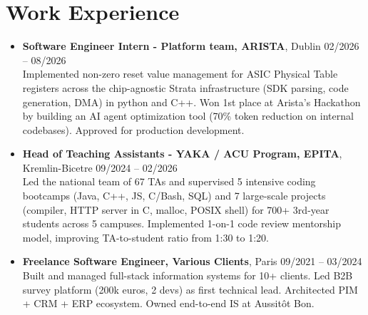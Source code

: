 \documentclass[9pt,a4paper]{article}
\begin{document}
\section*{Work Experience}
\begin{tcolorbox}[mybox]
\begin{itemize}
\item\textbf{Software Engineer Intern - Platform team, ARISTA}, Dublin \hfill {\small02/2026 – 08/2026}\\[0.5em]
\textcolor{gray!40!black}{Implemented non-zero reset value management for ASIC Physical Table registers across the chip-agnostic Strata infrastructure (SDK parsing, code generation, DMA) in python and C++.
Won 1st place at Arista's Hackathon by building an AI agent optimization tool (70\% token reduction on internal codebases). Approved for production development.}

\item\textbf{Head of Teaching Assistants - YAKA / ACU Program, EPITA}, Kremlin-Bicetre \hfill {\small09/2024 – 02/2026}\\[0.5em]
\textcolor{gray!40!black}{Led the national team of 67 TAs and supervised 5 intensive coding bootcamps (Java, C++, JS, C/Bash, SQL) and 7 large-scale projects (compiler, HTTP server in C, malloc, POSIX shell) for 700+ 3rd-year students across 5 campuses. Implemented 1-on-1 code review mentorship model, improving TA-to-student ratio from 1:30 to 1:20.}

\item\textbf{Freelance Software Engineer, Various Clients}, Paris \hfill {\small09/2021 – 03/2024}\\[0.5em]
\textcolor{gray!40!black}{Built and managed full-stack information systems for 10+ clients. Led B2B survey platform (200k euros, 2 devs) as first technical lead. Architected PIM + CRM + ERP ecosystem. Owned end-to-end IS at Aussitôt Bon.}
\end{itemize}
\end{tcolorbox}
\end{document}
